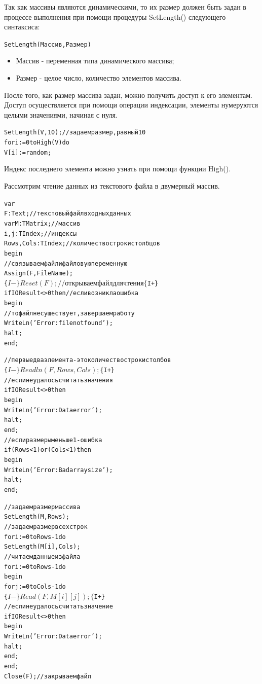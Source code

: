 \documentclass{beamer}
\begin{document}
\begin{frame}[fragile]
Так как массивы являются динамическими, то их размер должен быть задан в процессе выполнения при помощи процедуры SetLength() следующего синтаксиса:
\begin{alltt}
   SetLength(Массив, Размер)
\end{alltt}
\begin{itemize}
\item Массив - переменная типа динамического массива;
\item Размер - целое число, количество элементов массива.
\end{itemize}
После того, как размер массива задан, можно получить доступ к его элементам. Доступ осуществляется при помощи операции индексации, элементы нумеруются целыми значениями, начиная с нуля.
\begin{alltt}
  SetLength(V, 10); //задаем размер, равный 10
  for i := 0 to High(V) do
    V[i] := random;
\end{alltt}
Индекс последнего элемента можно узнать при помощи функции High().
\end{frame}

\begin{frame}[fragile]
Рассмотрим чтение данных из текстового файла в двумерный массив.
\begin{alltt}
var
  F: Text; //текстовый файл входных данных
  var M:TMatrix; //массив
  i, j: TIndex; //индексы
  Rows, Cols: TIndex; //количество строк и столбцов
begin
  //связываем файл и файловую переменную
  Assign(F, FileName);
  \{$I-\}
  Reset(F); //открываем файл для чтения
  \{$I+\}
  if IOResult <> 0 then //если возникла ошибка
  begin                 
    //то файл не существует, завершаем работу
    WriteLn('Error: file not found');
    halt;
  end;
\end{alltt}
\end{frame}

\begin{frame}[fragile]
\begin{alltt}
  //первые два элемента - это количество строк и столбов
  \{$I-\}
  Readln(F, Rows, Cols);
  \{$I+\}
  //если не удалось считать значения
  if IOResult <> 0 then
  begin
    WriteLn('Error: Data error');
    halt;
  end;
  //если размеры меньше 1 - ошибка
  if (Rows < 1) or (Cols < 1) then
  begin
    WriteLn('Error: Bad array size');
    halt;
  end;
\end{alltt}
\end{frame}

\begin{frame}[fragile]
\begin{alltt}
  //задаем размер массива
  SetLength(M, Rows);
  //задаем размер всех строк
  for i := 0 to Rows-1 do
    SetLength(M[i], Cols); 
  //читаем данные из файла
  for i := 0 to Rows-1 do
  begin
    for j := 0 to Cols-1 do
    \{$I-\}Read(F, M[i][j]);\{$I+\}
    //если не удалось считать значение
    if IOResult <> 0 then
    begin
      WriteLn('Error: Data error');
      halt;
    end;
  end;  
  Close(F); //закрываем файл 
\end{alltt}
\end{frame}
\end{document}
